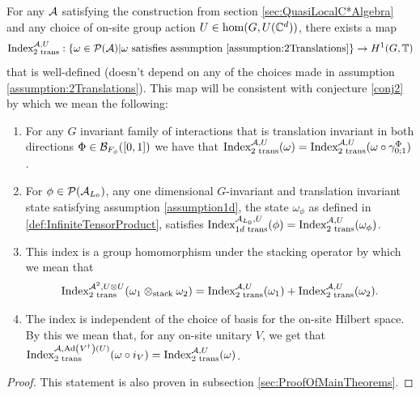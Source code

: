 \documentclass[11pt,a4paper,twoside]{article}
\numberwithin{equation}{section}
\begin{document}
	\begin{theorem}\label{thrm:ExistenceSecondIndex}
		For any $\AA$ satisfying the construction from section \ref{sec:QuasiLocalC*Algebra} and any choice of on-site group action $U\in\hom(G,U(\CC^d))$, there exists a map
		\begin{equation}
			\textrm{Index}^{\AA,U}_{2\text{ trans}}:\{\omega\in\PP(\AA)| \omega\text{ satisfies assumption \ref{assumption:2Translations}}\}\rightarrow H^1(G,\TT)
		\end{equation}
		that is well-defined (doesn't depend on any of the choices made in assumption \ref{assumption:2Translations}). This map will be consistent with conjecture \ref{conj2} by which we mean the following:
		\begin{enumerate}
			\item For any $G$ invariant family of interactions that is translation invariant in both directions $\Phi\in\BB_{F_\phi}([0,1])$ we have that $\textrm{Index}^{\AA,U}_{2\text{ trans}}(\omega)=\textrm{Index}^{\AA,U}_{2\text{ trans}}(\omega\circ\gamma^\Phi_{0;1})$.
			\item For $\phi\in\PP(\AA_{L_0})$, any one dimensional $G$-invariant and translation invariant state satisfying assumption \ref{assumption1d}, the state $\omega_\phi$ as defined in \ref{def:InfiniteTensorProduct}, satisfies $\textrm{Index}^{\AA_{L_0},U}_{1d\text{ trans}}(\phi)=\text{Index}^{\AA,U}_{2\text{ trans}}(\omega_\phi)$.
			\item This index is a group homomorphism under the stacking operator by which we mean that
			\begin{equation}
				\textrm{Index}_{\text{2 trans}}^{\AA^2,U\otimes U}(\omega_1\otimes_{\text{stack}}\omega_2)=\textrm{Index}_{\text{2 trans}}^{\AA,U}(\omega_1)+\textrm{Index}_{\text{2 trans}}^{\AA,U}(\omega_2).
			\end{equation}
			\item The index is independent of the choice of basis for the on-site Hilbert space. By this we mean that, for any on-site unitary $V$, we get that $\textrm{Index}^{\AA,\Ad{V^\dagger}(U)}_{\text{2 trans}}(\omega\circ i_V) =\textrm{Index}^{\AA,U}_{\text{2 trans}}(\omega)$.
		\end{enumerate}
	\end{theorem}
	\begin{proof}
		This statement is also proven in subsection \ref{sec:ProofOfMainTheorems}.
	\end{proof}
\end{document}
